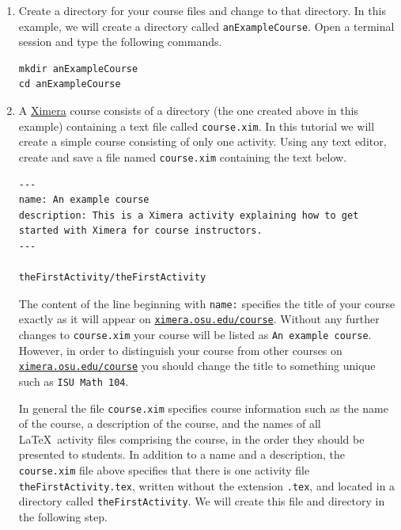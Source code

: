 \documentclass{ximera}
\begin{document}
\begin{enumerate}
\item Create a directory for your course files
and change to that directory.
In this example, we will create a directory called
\verb!anExampleCourse!.
Open a terminal session and type the following commands.
\begin{center}
\begin{verbatim}
mkdir anExampleCourse
cd anExampleCourse 
\end{verbatim}
\end{center}

\item A \href{http://ximera.osu.edu}{\sf Ximera} 
course consists of a directory (the one
created above in this example)
containing a text file called \verb!course.xim!. 
In this tutorial we will create a simple
course consisting of only one activity.
Using any text editor, create and save a file named
\verb!course.xim! containing the text below.

\begin{verbatim}
---
name: An example course
description: This is a Ximera activity explaining how to get started with Ximera for course instructors.
---

theFirstActivity/theFirstActivity
\end{verbatim}
\begin{warning}
The content of the line beginning with \verb!name:!
specifies the title of your course exactly as it will appear on
\href{http://ximera.osu.edu/course}{\tt ximera.osu.edu/course}.
Without any further changes to \verb!course.xim!
your course will be listed as \verb!An example course!.
However, in order to distinguish your course from
other courses on
\href{http://ximera.osu.edu/course}{\tt ximera.osu.edu/course}
you should change the title to something unique
such as \verb!ISU Math 104!.
\end{warning}

\begin{remark}
In general the file \verb!course.xim! specifies course information
such as the name of the course, a description of the course,
and the names of all \LaTeX\ activity files 
comprising the course, in the order
they should be presented to students.
In addition to a name and a description,
the \verb!course.xim! file above specifies that 
there is one activity file \verb!theFirstActivity.tex!,
written without the extension \verb!.tex!,  
and located in a directory called \verb!theFirstActivity!.
We will create this file and directory in the following step.


\end{remark}
\end{enumerate}
\end{document}
